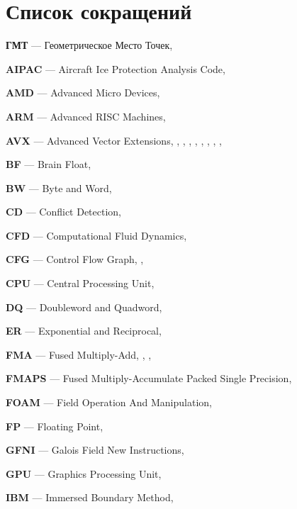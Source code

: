 \newpage

\section*{Список сокращений}

\textbf{ГМТ} --- Геометрическое Место Точек, \pageref{abbr:gmt}

\textbf{AIPAC} --- Aircraft Ice Protection Analysis Code, \pageref{abbr:aipac}

\textbf{AMD} --- Advanced Micro Devices, \pageref{abbr:amd}

\textbf{ARM} --- Advanced RISC Machines, \pageref{abbr:arm}

\textbf{AVX} --- Advanced Vector Extensions, \pageref{abbr:avx}, \pageref{abbr:avx2}, \pageref{abbr:avx3}, \pageref{abbr:avx4}, \pageref{abbr:avx5}, \pageref{abbr:avx6}, \pageref{abbr:avx7}, \pageref{abbr:avx8}, \pageref{abbr:avx9}

\textbf{BF} --- Brain Float, \pageref{abbr:bf}

\textbf{BW} --- Byte and Word, \pageref{abbr:bw}

\textbf{CD} --- Conflict Detection, \pageref{abbr:cd}

\textbf{CFD} --- Computational Fluid Dynamics, \pageref{abbr:cfd}

\textbf{CFG} --- Control Flow Graph, \pageref{abbr:cfg}, \pageref{abbr:cfg2}

\textbf{CPU} --- Central Processing Unit, \pageref{abbr:cpu}

\textbf{DQ} --- Doubleword and Quadword, \pageref{abbr:dq}

\textbf{ER} --- Exponential and Reciprocal, \pageref{abbr:er}

\textbf{FMA} --- Fused Multiply-Add, \pageref{abbr:fma}, \pageref{abbr:fma2}, \pageref{abbr:fma3}

\textbf{FMAPS} --- Fused Multiply-Accumulate Packed Single Precision, \pageref{abbr:fmaps}
 
\textbf{FOAM} --- Field Operation And Manipulation, \pageref{abbr:foam} 
 
\textbf{FP} --- Floating Point, \pageref{abbr:fp}

\textbf{GFNI} --- Galois Field New Instructions, \pageref{abbr:gfni}

\textbf{GPU} --- Graphics Processing Unit, \pageref{abbr:gpu}

\textbf{IBM} --- Immersed Boundary Method, \pageref{abbr:ibm}

